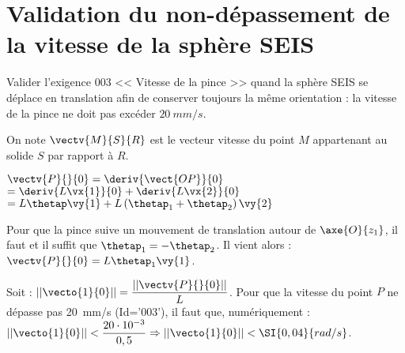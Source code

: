 \section{Validation du non-dépassement de la vitesse de la sphère SEIS}

\begin{obj}
Valider l’exigence 003 << Vitesse de la pince >> quand la sphère SEIS se déplace en 
translation afin de conserver toujours la même orientation : la vitesse de la pince ne doit pas excéder $\SI{20}{mm/s}$.
\end{obj}

On note $\vectv{M}{S}{R}$ est le vecteur vitesse du point $M$ appartenant au solide $S$ par rapport à $R$.


\ifprof
\begin{corrige}%
$\vectv{P}{}{0}= \deriv{\vect{OP}}{0}$  
$=\deriv{L\vx{1}}{0} + \deriv{L\vx{2}}{0}$
$=L\thetap \vy{1} + L\left(\thetap_1+\thetap_2\right) \vy{2}$
\end{corrige}
\else
\fi

%
\ifprof
\begin{corrige}%

\end{corrige}
\else
\fi

\ifprof
\begin{corrige}%
Pour que la pince suive un mouvement de translation autour de $\axe{O}{z_1}$, il faut et il suffit que $\thetap_1= -\thetap_2$. Il vient alors : $\vectv{P}{}{0} = L\thetap_1 \vy{1}$.

Soit : $||\vecto{1}{0}|| = \dfrac{||\vectv{P}{}{0}||}{L}$.
Pour que la vitesse du point $P$ ne dépasse pas \SI{20}{mm/s} (Id=’003’), il faut que, numériquement :$||\vecto{1}{0}|| < \dfrac{20\cdot 10^{-3}}{0,5}  \Rightarrow ||\vecto{1}{0}||<\SI{0,04}{rad/s}$.

\end{corrige}
\else
\fi
